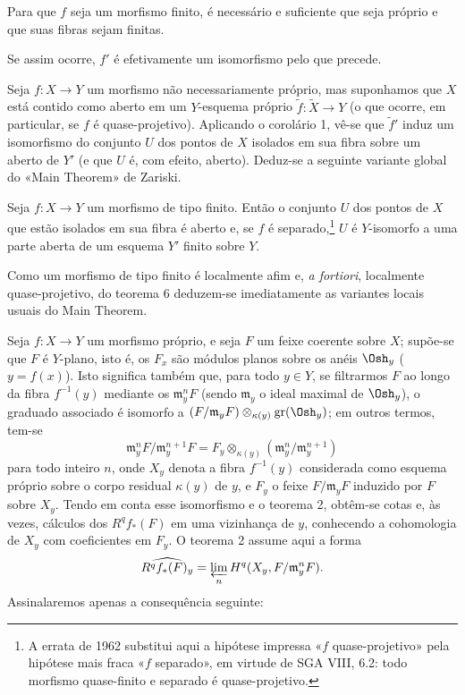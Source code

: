  Para que $f$ seja um morfismo finito, é necessário e
suficiente que seja próprio e que suas fibras sejam finitas.

Se assim ocorre, $f'$ é efetivamente um isomorfismo pelo que precede.

Seja $f:X\longrightarrow Y$ um morfismo não necessariamente próprio, mas
suponhamos que $X$ está contido como aberto em um $Y$-esquema próprio
$\widetilde f:\widetilde X\longrightarrow Y$ (o que ocorre, em particular,
se $f$ é quase-projetivo). Aplicando o corolário 1, vê-se que $\widetilde f'$
induz um isomorfismo do conjunto $U$ dos pontos de $X$ isolados em sua fibra
sobre um aberto de $Y'$ (e que $U$ é, com efeito, aberto). Deduz-se a
seguinte variante global do «Main Theorem» de Zariski.

 Seja
$f:X\longrightarrow Y$ um morfismo de tipo finito. Então o conjunto $U$ dos
pontos de $X$ que estão isolados em sua fibra é aberto e, se $f$ é
separado,\footnote{A errata de 1962 substitui aqui a hipótese impressa
«$f$ quase-projetivo» pela hipótese mais fraca «$f$ separado», em virtude de
SGA VIII, 6.2: todo morfismo quase-finito e separado é quase-projetivo.} $U$ é
$Y$-isomorfo a uma parte aberta de um esquema $Y'$ finito sobre $Y$.

Como um morfismo de tipo finito é localmente afim e, \textit{a fortiori},
localmente quase-projetivo, do teorema 6 deduzem-se imediatamente as variantes
locais usuais do Main Theorem.


Seja $f:X\longrightarrow Y$ um morfismo próprio, e seja $F$ um feixe coerente sobre
$X$; supõe-se que $F$ é $Y$-plano, isto é, os $F_x$ são módulos planos sobre os
anéis $\Osh_y$ ($y=f(x)$). Isto significa também que, para todo $y\in Y$, se
filtrarmos $F$ ao longo da fibra $f^{-1}(y)$ mediante os
$\mathfrak m_y^nF$ (sendo $\mathfrak m_y$ o ideal maximal de $\Osh_y$), o
graduado associado é isomorfo a
$(F/\mathfrak m_yF)\otimes_{\kappa(y)}\operatorname{gr}(\Osh_y)$; em outros
termos, tem-se
\[
  \mathfrak m_y^nF/\mathfrak m_y^{n+1}F
  =F_y\otimes_{\kappa(y)}
  (\mathfrak m_y^n/\mathfrak m_y^{n+1})
\]
para todo inteiro $n$, onde $X_y$ denota a fibra $f^{-1}(y)$ considerada como
esquema próprio sobre o corpo residual $\kappa(y)$ de $y$, e $F_y$ o feixe
$F/\mathfrak m_yF$ induzido por $F$ sobre $X_y$. Tendo em conta esse
isomorfismo e o teorema 2, obtêm-se cotas e, às vezes, cálculos dos
$R^qf_*(F)$ em uma vizinhança de $y$, conhecendo a cohomologia de $X_y$ com
coeficientes em $F_y$. O teorema 2 assume aqui a forma
\[
  \widehat{R^qf_*(F)_y}
  =\varprojlim_n H^q(X_y,F/\mathfrak m_y^nF).
\]
Assinalaremos apenas a consequência seguinte:


